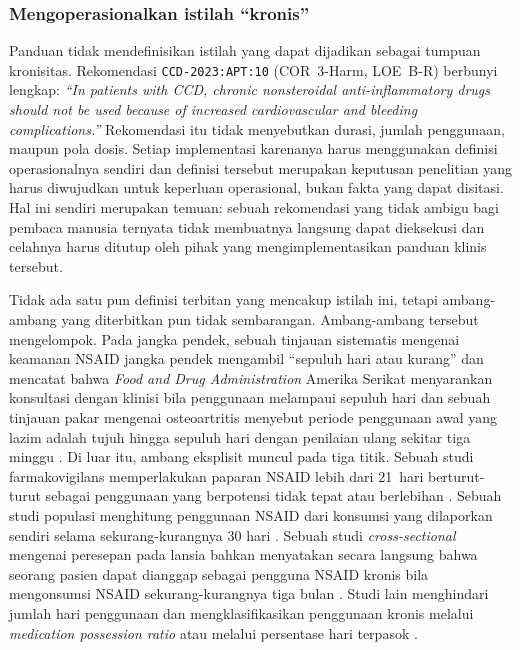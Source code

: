 \subsubsection*{Mengoperasionalkan istilah ``kronis''}
Panduan tidak mendefinisikan istilah yang dapat dijadikan sebagai tumpuan kronisitas. Rekomendasi
\texttt{CCD-2023:APT:10} (COR~3-Harm, LOE~B-R) berbunyi lengkap: \emph{``In patients with CCD,
chronic nonsteroidal anti-inflammatory drugs should not be used because of increased
cardiovascular and bleeding complications.''} Rekomendasi itu tidak menyebutkan durasi, jumlah
penggunaan, maupun pola dosis. Setiap implementasi karenanya harus menggunakan definisi
operasionalnya sendiri dan definisi tersebut merupakan keputusan penelitian yang harus
diwujudkan untuk keperluan operasional, bukan fakta yang dapat disitasi. Hal ini sendiri merupakan temuan: sebuah
rekomendasi yang tidak ambigu bagi pembaca manusia ternyata tidak membuatnya langsung dapat dieksekusi
dan celahnya harus ditutup oleh pihak yang mengimplementasikan panduan klinis tersebut.

Tidak ada satu pun definisi terbitan yang mencakup istilah ini, tetapi ambang-ambang yang
diterbitkan pun tidak sembarangan. Ambang-ambang tersebut mengelompok. Pada jangka pendek, sebuah
tinjauan sistematis mengenai keamanan NSAID jangka pendek mengambil ``sepuluh hari atau
kurang'' dan mencatat bahwa \emph{Food and Drug Administration} Amerika Serikat menyarankan
konsultasi dengan klinisi bila penggunaan melampaui sepuluh hari \cite{aminoshariae2016} dan
sebuah tinjauan pakar mengenai osteoartritis menyebut periode penggunaan awal yang lazim adalah tujuh
hingga sepuluh hari dengan penilaian ulang sekitar tiga minggu
\cite{magni2021}. Di luar itu, ambang eksplisit muncul pada tiga titik. Sebuah
studi farmakovigilans memperlakukan paparan NSAID lebih dari 21~hari
berturut-turut sebagai penggunaan yang berpotensi tidak tepat atau berlebihan
\cite{ussai2015}. Sebuah studi populasi menghitung penggunaan NSAID dari
konsumsi yang dilaporkan sendiri selama sekurang-kurangnya 30 hari
\cite{hessami2025}. Sebuah studi \emph{cross-sectional} mengenai peresepan pada
lansia bahkan menyatakan secara langsung bahwa seorang pasien dapat dianggap sebagai pengguna NSAID
kronis bila mengonsumsi NSAID sekurang-kurangnya tiga bulan
\cite{abdu2020}. Studi lain menghindari jumlah hari penggunaan dan
mengklasifikasikan penggunaan kronis melalui \emph{medication possession ratio}
\cite{campbell2022} atau melalui persentase hari terpasok \cite{kikuchi2021}.

